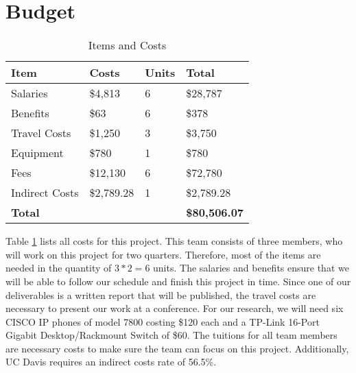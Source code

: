 \section{Budget}

\begin{table}
\centering
\caption{Items and Costs}
\label{budget}
\begin{tabular}{|l|l|l|l|}
\hline
\textbf{Item}  & \textbf{Costs} & \textbf{Units} & \textbf{Total}        \\ \hline
Salaries       & \$4,813        & 6              & \$28,787              \\ \hline
Benefits       & \$63           & 6              & \$378                 \\ \hline
Travel Costs   & \$1,250        & 3              & \$3,750               \\ \hline
Equipment      & \$780          & 1              & \$780                 \\ \hline
Fees           & \$12,130       & 6              & \$72,780              \\ \hline
Indirect Costs & \$2,789.28     & 1              & \$2,789.28           \\ \hline
\textbf{Total} &                &                & \textbf{\$80,506.07} \\ \hline
\end{tabular}
\end{table}

Table \ref{budget} lists all costs for this project. This team consists of three members, who will work on this project for two quarters. Therefore, most of the items are needed in the quantity of $3*2=6$ units. The salaries and benefits ensure that we will be able to follow our schedule and finish this project in time. Since one of our deliverables is a written report that will be published, the travel costs are necessary to present our work at a conference. For our research, we will need six CISCO IP phones of model 7800 costing \$120 each and a TP-Link 16-Port Gigabit Desktop/Rackmount Switch of \$60. The tuitions for all team members are necessary costs to make sure the team can focus on this project. Additionally, UC Davis requires an indirect costs rate of 56.5\%.
